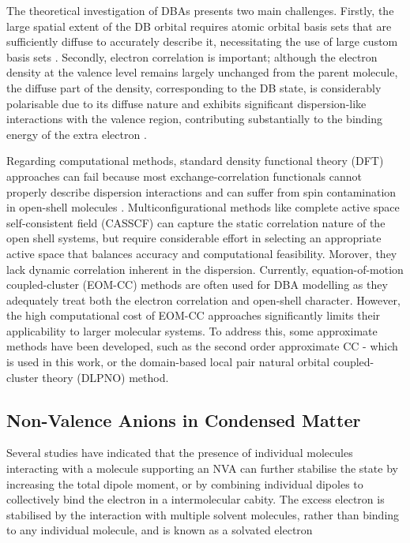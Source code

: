 The theoretical investigation of DBAs presents two main challenges. Firstly, the large spatial extent of the DB orbital requires atomic orbital basis sets that are sufficiently diffuse to accurately describe it, necessitating the use of large custom basis sets \cite{skurski2000choose}. Secondly, electron correlation is important; although the electron density at the valence level remains largely unchanged from the parent molecule, the diffuse part of the density, corresponding to the DB state, is considerably polarisable due to its diffuse nature and exhibits significant dispersion-like interactions with the valence region, contributing substantially to the binding energy of the extra electron \cite{simons2008molecular,simons2011theoretical,simons2023molecular,gutowski1996contribution,voora2017theoretical}.

Regarding computational methods, standard density functional theory (DFT) approaches can fail because most exchange-correlation functionals cannot properly describe dispersion interactions and can suffer from spin contamination in open-shell molecules \cite{thiam2023accurately}. Multiconfigurational methods like complete active space self-consistent field (CASSCF)\cite{vila2002theoretical,ivanov2015anion} can capture the static correlation nature of the open shell systems, but require considerable effort in selecting an appropriate active space that balances accuracy and computational feasibility. Morover, they lack dynamic correlation inherent in the dispersion. Currently, equation-of-motion coupled-cluster (EOM-CC)\cite{herbert2015quantum,jordan2003theory,moorby2024signatures} methods are often used for DBA modelling as they adequately treat both the electron correlation and open-shell character. However, the high computational cost of EOM-CC approaches significantly limits their applicability to larger molecular systems. To address this, some approximate methods have been developed, such as the second order approximate CC \cite{christiansen1995second,paran2024performance}- which is used in this work, or the domain-based local pair natural orbital coupled-cluster theory (DLPNO) method\cite{haldar2020multilayer,schulz2018systematic}.

\subsection{Non-Valence Anions in Condensed Matter}

Several studies have indicated that the presence of individual molecules interacting with a molecule supporting an NVA can further stabilise the state by increasing the total dipole moment, or by combining individual dipoles to collectively bind the electron in a intermolecular cabity. The excess electron is stabilised by the interaction with multiple solvent molecules, rather than binding to any individual molecule, and is known as a solvated electron \cite{schiedt1998anion,hall2002two,jalbout2001dipole,gutowski2002solvated,skurski2002excess,jordan2003theory,eustis2007photoelectron,simons2008molecular,herbert2015quantum,clarke2025role}

